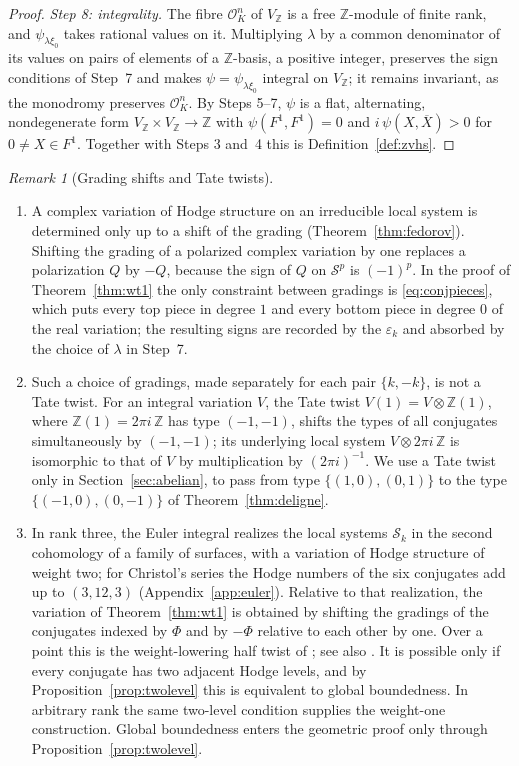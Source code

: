 \documentclass[11pt]{amsart}
\theoremstyle{definition}
\theoremstyle{remark}
\newtheorem{remark}[theorem]{Remark}
\numberwithin{equation}{section}
\newcommand{\Z}{\mathbb{Z}}
\newcommand{\cS}{\mathcal{S}}
\newcommand{\cO}{\mathcal{O}}
\begin{document}
\begin{proof}
\emph{Step 8: integrality.} The fibre $\cO_K^n$ of $V_\Z$ is a free $\Z$-module of finite rank, and $\psi_{\lambda\xi_0}$ takes rational values on it. Multiplying $\lambda$ by a common denominator of its values on pairs of elements of a $\Z$-basis, a positive integer, preserves the sign conditions of Step~7 and makes $\psi=\psi_{\lambda\xi_0}$ integral on $V_\Z$; it remains invariant, as the monodromy preserves $\cO_K^n$. By Steps 5--7, $\psi$ is a flat, alternating, nondegenerate form $V_\Z\times V_\Z\to\Z$ with $\psi(F^1,F^1)=0$ and $i\,\psi(X,\overline X)>0$ for $0\ne X\in F^1$. Together with Steps 3 and~4 this is Definition~\ref{def:zvhs}.
\end{proof}

\begin{remark}[Grading shifts and Tate twists]\label{rem:halftwist}
\begin{enumerate}[label=(\arabic*),leftmargin=2em]
\item A complex variation of Hodge structure on an irreducible local system is determined only up to a shift of the grading (Theorem~\ref{thm:fedorov}). Shifting the grading of a polarized complex variation by one replaces a polarization $Q$ by $-Q$, because the sign of $Q$ on $\cS^p$ is $(-1)^p$. In the proof of Theorem~\ref{thm:wt1} the only constraint between gradings is \eqref{eq:conjpieces}, which puts every top piece in degree $1$ and every bottom piece in degree $0$ of the real variation; the resulting signs are recorded by the $\varepsilon_k$ and absorbed by the choice of $\lambda$ in Step~7.
\item Such a choice of gradings, made separately for each pair $\{k,-k\}$, is not a Tate twist. For an integral variation $V$, the Tate twist $V(1)=V\otimes\Z(1)$, where $\Z(1)=2\pi i\,\Z$ has type $(-1,-1)$, shifts the types of all conjugates simultaneously by $(-1,-1)$; its underlying local system $V\otimes2\pi i\,\Z$ is isomorphic to that of $V$ by multiplication by $(2\pi i)^{-1}$. We use a Tate twist only in Section~\ref{sec:abelian}, to pass from type $\{(1,0),(0,1)\}$ to the type $\{(-1,0),(0,-1)\}$ of Theorem~\ref{thm:deligne}.
\item In rank three, the Euler integral realizes the local systems $\cS_k$ in the second cohomology of a family of surfaces, with a variation of Hodge structure of weight two; for Christol's series the Hodge numbers of the six conjugates add up to $(3,12,3)$ (Appendix~\ref{app:euler}). Relative to that realization, the variation of Theorem~\ref{thm:wt1} is obtained by shifting the gradings of the conjugates indexed by $\Phi$ and by $-\Phi$ relative to each other by one. Over a point this is the weight-lowering half twist of \citet{vanGeemen2001}; see also \citet{vanGeemenIzadi2002}. It is possible only if every conjugate has two adjacent Hodge levels, and by Proposition~\ref{prop:twolevel} this is equivalent to global boundedness. In arbitrary rank the same two-level condition supplies the weight-one construction. Global boundedness enters the geometric proof only through Proposition~\ref{prop:twolevel}.
\end{enumerate}
\end{remark}
\end{document}
